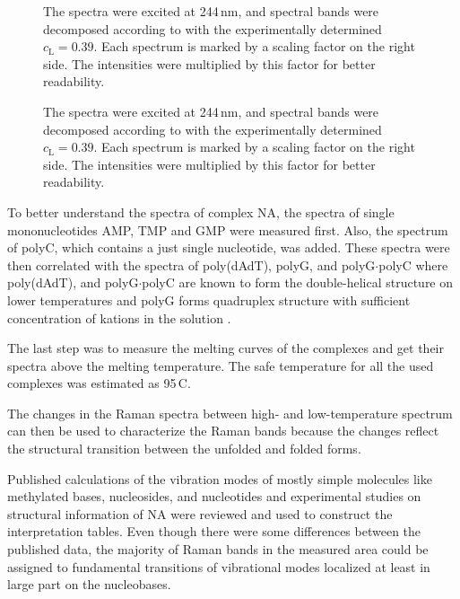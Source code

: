 \begin{figure}
	\centering
	
	\caption[%
		Spectra of AMP, TMP and poly(dAdT) obtained at 5\,\textdegree{}C and
		95\,\textdegree{}C.
	]{%
		The spectra were excited at 244\,nm, and spectral bands were decomposed
		according to
		with the experimentally determined
		$c_\text{L} = 0.39$.
		Each spectrum is marked by a scaling factor on the right side.
		The intensities were multiplied by this factor for better readability.}
	\label{\figlabel{interpretation:at}}
\end{figure}

\begin{figure}
	\centering
	
	\caption[%
			Spectra of GMP, polyC, poly(G) and polyG$\cdot$polyC obtained at
			5\,\textdegree{}C and 95\,\textdegree{}C.
	]{%
		The spectra were excited at 244\,nm, and spectral bands were decomposed
		according to
		with the experimentally determined
		$c_\text{L} = 0.39$.
		Each spectrum is marked by a scaling factor on the right side.
		The intensities were multiplied by this factor for better readability.}
	\label{\figlabel{interpretation:gc}}
\end{figure}

To better understand the spectra of complex NA, the spectra of single
mononucleotides AMP, TMP and GMP were measured first.
Also, the spectrum of polyC, which contains a just single nucleotide, was
added.
These spectra were then correlated with the spectra of poly(dAdT), polyG, and
polyG$\cdot$polyC where poly(dAdT), and polyG$\cdot$polyC are known to form the
double-helical structure on lower temperatures
\parencite{Benevides2005}
and polyG forms quadruplex structure with sufficient concentration of kations
in the solution
\parencite{Simard1994}.

The last step was to measure the melting curves of the complexes and get
their spectra above the melting temperature. The safe temperature for all the
used complexes was estimated as 95\,\textdegree{}C.

The changes in the Raman spectra between high- and low-temperature spectrum
can then be used to characterize the Raman bands because the changes
reflect the structural transition between the unfolded and folded forms.

Published calculations of the vibration modes of mostly simple molecules like
methylated bases, nucleosides, and nucleotides and experimental studies on
structural information of NA were reviewed and used to construct the
interpretation tables.
Even though there were some differences between the published data, the
majority of Raman bands in the measured area could be assigned to fundamental
transitions of vibrational modes localized at least in large part on the
nucleobases.
